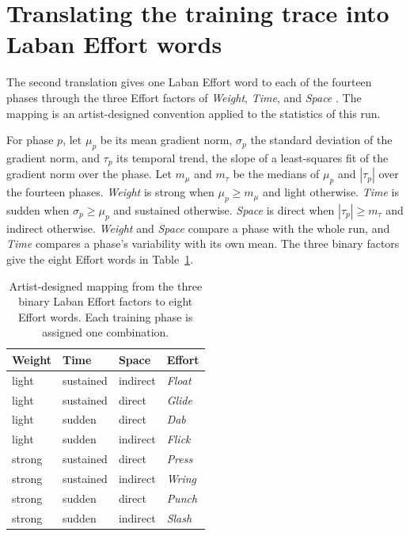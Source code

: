\section{Translating the training trace into Laban Effort words}
\label{app:effort}

The second translation gives one Laban Effort word to each of the fourteen phases through the three Effort factors of \textit{Weight}, \textit{Time}, and \textit{Space} \citep{laban1947effort}.
The mapping is an artist-designed convention applied to the statistics of this run.

For phase \(p\), let \(\mu_p\) be its mean gradient norm, \(\sigma_p\) the standard deviation of the gradient norm, and \(\tau_p\) its temporal trend, the slope of a least-squares fit of the gradient norm over the phase.
Let \(m_\mu\) and \(m_\tau\) be the medians of \(\mu_p\) and \(|\tau_p|\) over the fourteen phases.
\textit{Weight} is strong when \(\mu_p \geq m_\mu\) and light otherwise.
\textit{Time} is sudden when \(\sigma_p \geq \mu_p\) and sustained otherwise.
\textit{Space} is direct when \(|\tau_p| \geq m_\tau\) and indirect otherwise.
\textit{Weight} and \textit{Space} compare a phase with the whole run, and \textit{Time} compares a phase's variability with its own mean.
The three binary factors give the eight Effort words in Table~\ref{tab:effort}.

\begin{table}[h]
  \centering
  \begin{tabular}{llll}
    \hline
    Weight & Time & Space & Effort \\
    \hline
    light  & sustained & indirect & \textit{Float} \\
    light  & sustained & direct   & \textit{Glide} \\
    light  & sudden    & direct   & \textit{Dab} \\
    light  & sudden    & indirect & \textit{Flick} \\
    strong & sustained & direct   & \textit{Press} \\
    strong & sustained & indirect & \textit{Wring} \\
    strong & sudden    & direct   & \textit{Punch} \\
    strong & sudden    & indirect & \textit{Slash} \\
    \hline
  \end{tabular}
  \caption{Artist-designed mapping from the three binary Laban Effort factors
  to eight Effort words. Each training phase is assigned one combination.}
  \label{tab:effort}
\end{table}

